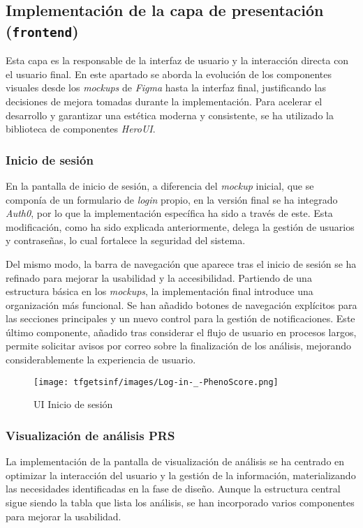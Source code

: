 \subsection{Implementación de la capa de presentación (\texttt{frontend})}
\label{subsec:desarrollo_frontend}
Esta capa es la responsable de la interfaz de usuario y la interacción directa con el usuario final. En este apartado se aborda la evolución de los componentes visuales desde los \textit{mockups} de \textit{Figma} hasta la interfaz final, justificando las decisiones de mejora tomadas durante la implementación. Para acelerar el desarrollo y garantizar una estética moderna y consistente, se ha utilizado la biblioteca de componentes \textit{HeroUI}.

\subsubsection{Inicio de sesión}
En la pantalla de inicio de sesión, a diferencia del \textit{mockup} inicial, que se componía de un formulario de \textit{login} propio, en la versión final se ha integrado \textit{Auth0}, por lo que la implementación específica ha sido a través de este. Esta modificación, como ha sido explicada anteriormente, delega la gestión de usuarios y contraseñas, lo cual fortalece la seguridad del sistema.

Del mismo modo, la barra de navegación que aparece tras el inicio de sesión se ha refinado para mejorar la usabilidad y la accesibilidad. Partiendo de una estructura básica en los \textit{mockups}, la implementación final introduce una organización más funcional. Se han añadido botones de navegación explícitos para las secciones principales y un nuevo control para la gestión de notificaciones. Este último componente, añadido tras considerar el flujo de usuario en procesos largos, permite solicitar avisos por correo sobre la finalización de los análisis, mejorando considerablemente la experiencia de usuario.

\begin{figure}[H]
    \centering
    \texttt{[image: tfgetsinf/images/Log-in-\_-PhenoScore.png]}
    \caption{UI Inicio de sesión}
    \label{fig:UIlogIn}
\end{figure}

\subsubsection{Visualización de análisis PRS}
La implementación de la pantalla de visualización de análisis se ha centrado en optimizar la interacción del usuario y la gestión de la información, materializando las necesidades identificadas en la fase de diseño. Aunque la estructura central sigue siendo la tabla que lista los análisis, se han incorporado varios componentes para mejorar la usabilidad.

